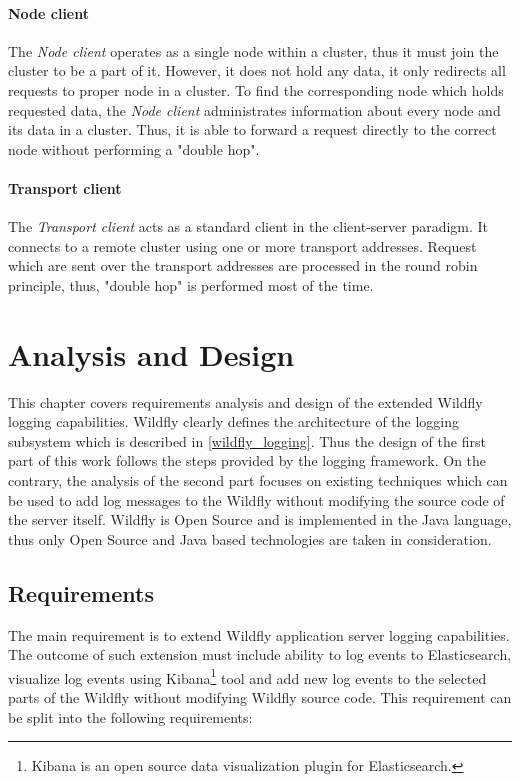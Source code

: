 \documentclass[12pt,oneside]{fithesis2}
\begin{document}
\subsubsection{Node client}
The \textit{Node client} operates as a single node within a cluster, thus it must join the cluster to be a part of it. However, it does not hold any data, it only redirects all requests to proper node in a cluster. To find the corresponding node which holds requested data, the \textit{Node client} administrates information about every node and its data in a cluster. Thus, it is able to forward a request directly to the correct node without performing a "double hop".

\subsubsection{Transport client}
The \textit{Transport client} acts as a standard client in the client-server paradigm. It connects to a remote cluster using one or more transport addresses. Request which are sent over the transport addresses are processed in the round robin principle, thus, "double hop" is performed most of the time.

\chapter{Analysis and Design}
This chapter covers requirements analysis and design of the extended Wildfly logging capabilities. Wildfly clearly defines the architecture of the logging subsystem which is described in \ref{wildfly_logging}. Thus the design of the first part of this work follows the steps provided by the logging framework. On the contrary, the analysis of the second part focuses on existing techniques which can be used to add log messages to the Wildfly without modifying the source code of the server itself. Wildfly is Open Source and is implemented in the Java language, thus only Open Source and Java based technologies are taken in consideration.

\section{Requirements}
The main requirement is to extend Wildfly application server logging capabilities. The outcome of such extension must include ability to log events to Elasticsearch, visualize log events using Kibana\footnote{Kibana is an open source data visualization plugin for Elasticsearch.} tool and add new log events to the selected parts of the Wildfly without modifying Wildfly source code. This requirement can be split into the following requirements:
\end{document}
